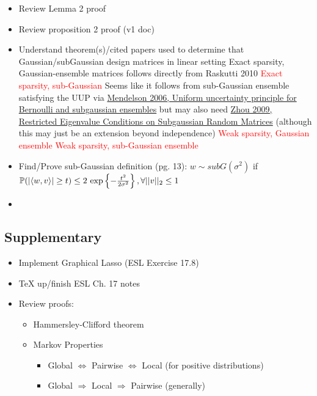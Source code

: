 \documentclass[11pt]{article}
\begin{document}
\begin{itemize}
    \item Review Lemma 2 proof 
    \item Review proposition 2 proof (v1 doc) 
    \item Understand theorem(s)/cited papers used to determine that Gaussian/subGaussian design matrices in linear setting
        \subitem Exact sparsity, Gaussian-ensemble matrices follows directly from Raskutti 2010 
        \subitem \textcolor{red}{Exact sparsity, sub-Gaussian} Seems like it follows from sub-Gaussian ensemble satisfying the UUP via \href{https://arxiv.org/pdf/math/0608665.pdf}{Mendelson 2006, Uniform uncertainty principle for Bernoulli and subgaussian ensembles} but may also need \href{https://arxiv.org/pdf/0912.4045.pdf}{Zhou 2009, Restricted Eigenvalue Conditions on Subgaussian Random Matrices} (although this may just be an extension beyond independence)
        \subitem \textcolor{red}{Weak sparsity, Gaussian ensemble}
        \subitem \textcolor{red}{Weak sparsity, sub-Gaussian ensemble}
    \item  Find/Prove sub-Gaussian definition (pg. 13): \newline 
        $w\sim subG(\sigma^2)$ if $\mathbb{P}(|\langle w, v\rangle|\geq t) \leq 2\ \text{exp}\left\{ -\frac{t^2}{2\sigma^2} \right\}, \forall ||v||_2 \leq 1$
    \item 
\end{itemize}


\subsection*{Supplementary}

\begin{itemize}
    \item Implement Graphical Lasso (ESL Exercise 17.8)
    \item TeX up/finish ESL Ch. 17 notes 
    \item Review proofs:
    \begin{itemize}
    	\item Hammersley-Clifford theorem
	    \item Markov Properties  
        \begin{itemize}
            \item Global $\Leftrightarrow$ Pairwise $\Leftrightarrow$ Local (for positive distributions)
            \item Global $\Rightarrow$ Local $\Rightarrow$ Pairwise (generally)
        \end{itemize}
    \end{itemize}
\end{itemize}
\end{document}
